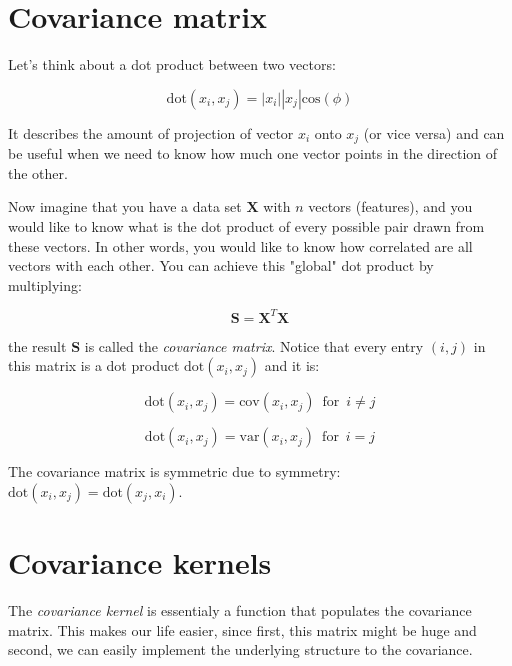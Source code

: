 \documentclass[10pt,twocolumn]{article}
\begin{document}
\section{Covariance matrix}

Let's think about a dot product between two vectors:

\begin{equation}
\text{dot}(x_i, x_j) = |x_i| |x_j| \text{cos}(\phi)
\end{equation}

It describes the amount of projection of vector $x_i$ onto $x_j$ (or vice versa) and can be useful when we need to know how much one vector points in the direction of the other. 

Now imagine that you have a data set $\mathbf{X}$ with $n$ vectors (features), and you would like to know what is the dot product of every possible pair drawn from these vectors. In other words, you would like to know how correlated are all vectors with each other. You can achieve this "global" dot product by multiplying:

\begin{equation}
\mathbf{S} = \mathbf{X}^T \mathbf{X} 
\end{equation}

the result $\mathbf{S}$ is called the \textit{covariance matrix}. Notice that every entry $(i,j)$ in this matrix is a dot product $\text{dot}(x_i, x_j)$ and it is:

\begin{equation}
\text{dot}(x_i, x_j) = \text{cov}(x_i, x_j) \,\,\, \text{for} \,\,\, i \neq j
\end{equation}

\begin{equation}
\text{dot}(x_i, x_j) = \text{var}(x_i, x_j) \,\,\, \text{for} \,\,\, i = j
\end{equation}

The covariance matrix is symmetric due to symmetry: $\text{dot}(x_i, x_j) = \text{dot}(x_j, x_i)$.

\section{Covariance kernels}

The \textit{covariance kernel} is essentialy a function that populates the covariance matrix. This makes our life easier, since first, this matrix might be huge and second, we can easily implement the underlying structure to the covariance.
\end{document}
